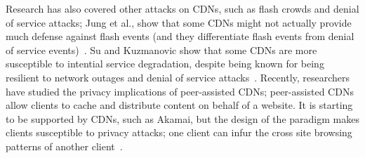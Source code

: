 Research has also covered other attacks on CDNs, such as flash crowds and denial of service attacks; Jung et al., show 
that some CDNs might not actually provide much defense against flash events (and they differentiate flash events from denial 
of service events)~\cite{jung2002flash}. Su and Kuzmanovic show that some CDNs are more susceptible to intential service 
degradation, despite being known for being resilient to network outages and denial of service attacks~\cite{su2008thinning}. 
Recently, researchers have studied the privacy implications of peer-assisted CDNs; peer-assisted CDNs allow clients to cache and distribute 
content on behalf of a website.  It is starting to be supported by CDNs, such as Akamai, but the design of the paradigm
makes clients susceptible to privacy attacks; one client can infur the cross site browsing patterns of another client~\cite{jia2016anonymity}.
